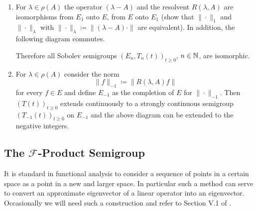 \begin{remarks*}\label{rem:a1-19.1}
\begin{enumerate}[\upshape(i), wide, labelindent=.5em]
\item
For $\lambda \in \rho(A)$ the operator $(\lambda - A)$ and the resolvent $R(\lambda,A)$ are isomorphisms from $E_{1}$ onto $E$, \resp from $E$ onto $E_{1}$ (show that $\|\cdot\|_{1}$ and $\|\cdot\|_{\lambda}$ with $\|\cdot\|_{\lambda} \coloneqq \|(\lambda - A)\cdot\|$ are equivalent).
In addition, the following diagram commutes. 
\begin{center}
\end{center}
Therefore all Sobolev semigroups $(E_{n}, T_{n}(t))_{t \geq 0}$, $n \in \mathbb{N}$, are isomorphic.

\item
For $\lambda \in \rho(A)$ consider the norm
\[
    \|f\|_{-1} \coloneqq \|R(\lambda,A)f\|
\]
for every $f \in E$ and define $E_{-1}$ as the completion of $E$ for $\|\cdot\|_{-1}$.
Then $(T(t))_{t \geq 0}$ extends continuously to a strongly continuous semigroup $(T_{-1}(t))_{t \geq 0}$ on $E_{-1}$ and the above diagram can be extended to the negative integers.
\end{enumerate}
\end{remarks*}
\subsection{The \texorpdfstring{$\mathcal{F}$}{F}-Product Semigroup}\label{subsec:a1-3.7}
It is standard in functional analysis to consider a sequence of points in a certain space as a point in a new and larger space.
In particular such a method can serve to convert an approximate eigenvector of a linear operator into an eigenvector.
Occasionally we will need such a construction and refer to Section V.1 of \citet{schaefer:1974}. 

